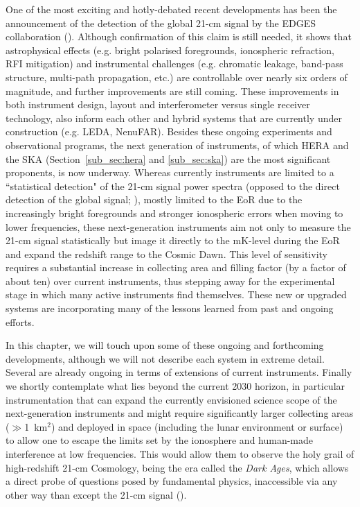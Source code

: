 One of the most exciting and hotly-debated recent developments has been the announcement of the detection of the global 21-cm signal by the EDGES collaboration (\cite{bowman18}). Although confirmation of this claim is still needed, it shows that astrophysical effects (e.g. bright polarised foregrounds, ionospheric refraction, RFI mitigation) and instrumental challenges (e.g. chromatic leakage, band-pass structure, multi-path propagation, etc.) are controllable over nearly six orders of magnitude, and further improvements are still coming. 
%
These improvements in both instrument design, layout and interferometer versus single receiver technology, also inform each other and hybrid systems that are currently under construction (e.g. LEDA, NenuFAR).
%
Besides these ongoing experiments and observational programs, the next generation of instruments, of which HERA and the SKA (Section~\ref{sub_sec:hera} and \ref{sub_sec:ska}) are the most significant proponents, is now underway. Whereas currently instruments are limited to a ``statistical detection" of the 21-cm signal power spectra (opposed to the direct detection of the global signal; \cite{mesinger16}), mostly limited to the EoR due to the increasingly bright foregrounds and stronger ionospheric errors when moving to lower frequencies, these next-generation instruments aim not only to measure the 21-cm signal statistically but image it directly to the mK-level during the EoR and expand the redshift range to the Cosmic Dawn. This level of sensitivity requires a substantial increase in collecting area and filling factor (by a factor of about ten) over current instruments, thus stepping away for the experimental stage in which many active instruments find themselves. These new or upgraded systems are incorporating many of the lessons learned from past and ongoing efforts.   
%

In this chapter, we will touch upon some of these ongoing and forthcoming developments, although we will not describe each system in extreme detail. Several are already ongoing in terms of extensions of current instruments. 
Finally we shortly contemplate what lies beyond the current 2030 horizon, in particular instrumentation that can expand the currently envisioned science scope of the next-generation instruments and might require significantly larger collecting areas ($\gg$1~km$^2$) and deployed in space (including the lunar environment or surface) to allow one to escape the limits set by the ionosphere and human-made interference at low frequencies. This would allow them to observe the holy grail of high-redshift 21-cm Cosmology, being the era called the {\sl Dark Ages}, which allows a direct probe of questions posed by fundamental physics, inaccessible via any other way than except the 21-cm signal (\cite{koopmans19}).




